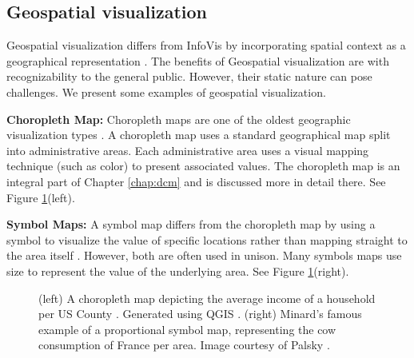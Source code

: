 \subsection{Geospatial visualization}
Geospatial visualization differs from InfoVis by incorporating spatial context as a geographical representation \cite{dykes2005exploring}. The benefits of Geospatial visualization are with recognizability to the general public. However, their static nature can pose challenges. We present some examples of geospatial visualization. 


\noindent
\textbf{Choropleth Map:} Choropleth maps are one of the oldest geographic visualization types \cite{dupin1827carte}. A choropleth map uses a standard geographical map split into administrative areas. Each administrative area uses a visual mapping technique (such as color) to present associated values. The choropleth map is an integral part of Chapter \ref{chap:dcm} and is discussed more in detail there. See Figure \ref{fig:geo}(left).

\noindent
\textbf{Symbol Maps:} A symbol map differs from the choropleth map by using a symbol to visualize the value of specific locations rather than mapping straight to the area itself \cite{cabello2010algorithmic}. However, both are often used in unison. Many symbols maps use size to represent the value of the underlying area. See Figure \ref{fig:geo}(right).
\vspace{1.2cm}

\begin{figure}[hb]
\centering
{}
\caption{(left) A choropleth map depicting the average income of a household per US County \cite{USCB2}. Generated using QGIS \cite{qgis2015qgis} . (right) Minard's famous example of a proportional symbol map, representing the cow consumption of France per area. Image courtesy of Palsky \cite{minard1858carte}.} \label{fig:geo} 
\end{figure}

